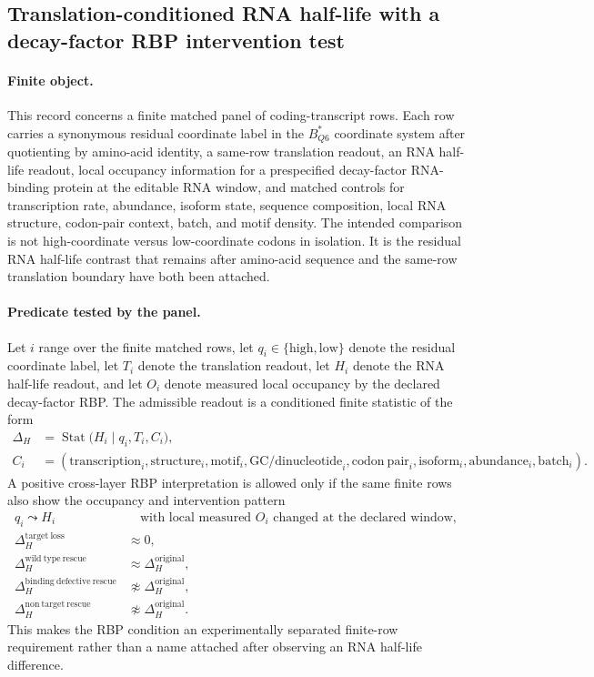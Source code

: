 \subsection{Translation-conditioned RNA half-life with a decay-factor RBP intervention test}
\label{sec:q6-translation-conditioned-rna-half-life-rbp-bridge-cross-layer}

\paragraph{Finite object.}
This record concerns a finite matched panel of coding-transcript rows.  Each row carries a synonymous residual coordinate label in the $B^*_{Q6}$ coordinate system after quotienting by amino-acid identity, a same-row translation readout, an RNA half-life readout, local occupancy information for a prespecified decay-factor RNA-binding protein at the editable RNA window, and matched controls for transcription rate, abundance, isoform state, sequence composition, local RNA structure, codon-pair context, batch, and motif density.  The intended comparison is not high-coordinate versus low-coordinate codons in isolation.  It is the residual RNA half-life contrast that remains after amino-acid sequence and the same-row translation boundary have both been attached.

\paragraph{Predicate tested by the panel.}
Let $i$ range over the finite matched rows, let $q_i \in \{\mathrm{high},\mathrm{low}\}$ denote the residual coordinate label, let $T_i$ denote the translation readout, let $H_i$ denote the RNA half-life readout, and let $O_i$ denote measured local occupancy by the declared decay-factor RBP.  The admissible readout is a conditioned finite statistic of the form
$$
\begin{aligned}
\Delta_H
  &= \operatorname{Stat}\bigl(H_i \mid q_i, T_i, C_i\bigr),\\
C_i
  &= (\mathrm{transcription}_i,\mathrm{structure}_i,\mathrm{motif}_i,\mathrm{GC/dinucleotide}_i,
      \mathrm{codon\ pair}_i,\mathrm{isoform}_i,\mathrm{abundance}_i,\mathrm{batch}_i).
\end{aligned}
$$
A positive cross-layer RBP interpretation is allowed only if the same finite rows also show the occupancy and intervention pattern
$$
\begin{aligned}
q_i \leadsto H_i
&\quad\text{with local measured } O_i \text{ changed at the declared window},\\
\Delta_H^{\mathrm{target\ loss}} &\approx 0,\\
\Delta_H^{\mathrm{wild\ type\ rescue}} &\approx \Delta_H^{\mathrm{original}},\\
\Delta_H^{\mathrm{binding\ defective\ rescue}} &\not\approx \Delta_H^{\mathrm{original}},\\
\Delta_H^{\mathrm{non\ target\ rescue}} &\not\approx \Delta_H^{\mathrm{original}}.
\end{aligned}
$$
This makes the RBP condition an experimentally separated finite-row requirement rather than a name attached after observing an RNA half-life difference.


